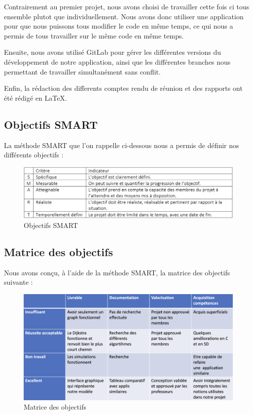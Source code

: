 \documentclass[french,a4paper]{article}
\begin{document}
Contrairement au premier projet, nous avons choisi de travailler cette fois ci tous ensemble plutot que individuellement. Nous avons donc utiliser une 
application pour que nous puissons tous modifier le code en même temps, ce qui nous a permis de tous travailler sur le même code en même temps.

Ensuite, nous avons utilisé GitLab pour gérer les différentes versions du développement de notre application, ainsi que les différentes 
branches nous permettant de travailler simultanément sans conflit.

Enfin, la rédaction des differents comptes rendu de réunion et des rapports ont été rédigé en \LaTeX.

\subsection{Objectifs SMART}
La méthode SMART que l'on rappelle ci-dessous nous a permis de définir nos différents objectifs :

\begin{figure}[H]
    \centering
    \includegraphics[width=1\textwidth]{img/SMART.png}
    \caption{Objectifs SMART}
\end{figure}

\subsection{Matrice des objectifs}
Nous avons conçu, à l'aide de la méthode SMART, la matrice des objectifs suivante :

\begin{figure}[H]
    \centering
    \includegraphics[width=1\textwidth]{img/matrice_des_objectifs.png}
    \caption{Matrice des objectifs}
\end{figure}
\end{document}
